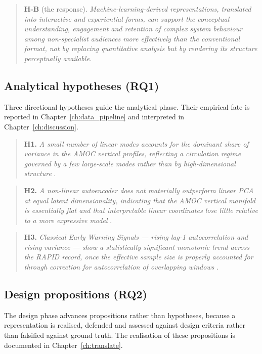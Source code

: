 \begin{quote}
\textbf{H-B} (the response). \emph{Machine-learning-derived representations, translated into interactive and experiential forms, can support the conceptual understanding, engagement and retention of complex system behaviour among non-specialist audiences more effectively than the conventional format, not by replacing quantitative analysis but by rendering its structure perceptually available.}
\end{quote}

\subsection*{Analytical hypotheses (RQ1)}

Three directional hypotheses guide the analytical phase. Their empirical fate is reported in Chapter~\ref{ch:data_pipeline} and interpreted in Chapter~\ref{ch:discussion}.

\begin{quote}
\textbf{H1.} \emph{A small number of linear modes accounts for the dominant share of variance in the AMOC vertical profiles, reflecting a circulation regime governed by a few large-scale modes rather than by high-dimensional structure} \citep{hannachi2007, buckley2016}.
\end{quote}

\begin{quote}
\textbf{H2.} \emph{A non-linear autoencoder does not materially outperform linear PCA at equal latent dimensionality, indicating that the AMOC vertical manifold is essentially flat and that interpretable linear coordinates lose little relative to a more expressive model} \citep{baldi1989}.
\end{quote}

\begin{quote}
\textbf{H3.} \emph{Classical Early Warning Signals --- rising lag-1 autocorrelation and rising variance --- show a statistically significant monotonic trend across the RAPID record, once the effective sample size is properly accounted for through correction for autocorrelation of overlapping windows} \citep{dakos2012, scheffer2009}.
\end{quote}

\subsection*{Design propositions (RQ2)}

The design phase advances propositions rather than hypotheses, because a representation is realised, defended and assessed against design criteria rather than falsified against ground truth. The realisation of these propositions is documented in Chapter~\ref{ch:translate}.

